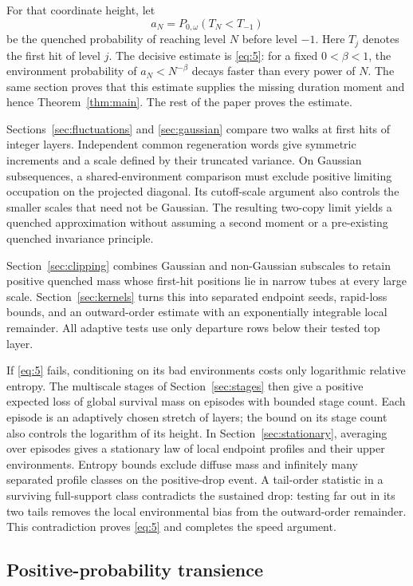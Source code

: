 For that coordinate height, let
\[
 a_N=P_{0,\omega}(T_N<T_{-1})
\]
be the quenched probability of reaching level $N$ before level $-1$.
Here $T_j$ denotes the first hit of level $j$. The decisive estimate is
\eqref{eq:5}: for a fixed $0<\beta<1$, the environment probability of
$a_N<N^{-\beta}$ decays faster than every power of $N$. The same section
proves that this estimate supplies the missing duration moment and hence
Theorem~\ref{thm:main}. The rest of the paper proves the estimate.

Sections~\ref{sec:fluctuations} and \ref{sec:gaussian} compare two walks
at first hits of integer layers. Independent common regeneration words
give symmetric increments and a scale defined by their truncated variance.
On Gaussian subsequences, a shared-environment comparison must exclude
positive limiting occupation on the projected diagonal. Its cutoff-scale
argument also controls the smaller scales that need not be Gaussian.
The resulting two-copy limit yields a quenched approximation without
assuming a second moment or a pre-existing quenched invariance principle.

Section~\ref{sec:clipping} combines Gaussian and non-Gaussian subscales
to retain positive quenched mass whose first-hit positions lie in narrow
tubes at every large scale. Section~\ref{sec:kernels} turns this into separated endpoint seeds,
rapid-loss bounds, and an outward-order estimate with an exponentially
integrable local remainder. All adaptive tests use only departure rows
below their tested top layer.

If \eqref{eq:5} fails, conditioning on its bad environments costs only
logarithmic relative entropy. The multiscale stages of
Section~\ref{sec:stages} then give a positive expected loss of global survival mass on episodes
with bounded stage count. Each episode is an adaptively chosen stretch
of layers; the bound on its stage count also controls the logarithm of
its height. In Section~\ref{sec:stationary}, averaging
over episodes gives a stationary law of local endpoint profiles and
their upper environments. Entropy bounds exclude diffuse mass and
infinitely many separated profile classes on the positive-drop event.
A tail-order statistic in a surviving full-support class contradicts
the sustained drop: testing far out in its two tails removes the local
environmental bias from the outward-order remainder. This contradiction
proves \eqref{eq:5} and completes the speed argument.

\subsection{Positive-probability transience}

